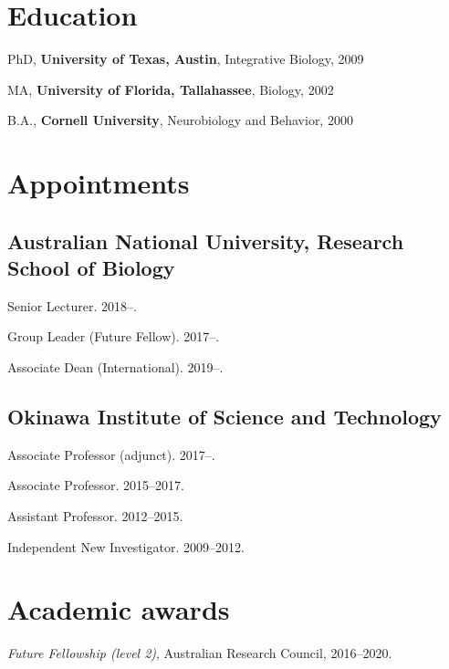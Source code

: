 \documentclass[11pt]{article}
\title{}
\def\printdate#1{\xprintdate#1-}
\def\xprintdate#1-#2-#3-{#1}
\def\daterange#1#2{\xprintdate#1---\xprintdate#2-}
\begin{document}
\maketitle

\section{Education}

\ind PhD, \textbf{University of Texas, Austin}, Integrative Biology, \printdate{2009-05-01}


\ind MA, \textbf{University of Florida, Tallahassee}, Biology, \printdate{2002-05-01}


\ind B.A., \textbf{Cornell University}, Neurobiology and Behavior, \printdate{2000-05-01}



\section{Appointments}

\subsection{Australian National University, Research School of Biology}
\ind Senior Lecturer. \printdate{2018-06-01}--.

\ind Group Leader (Future Fellow). \printdate{2017-07-30}--.

\ind Associate Dean (International). \printdate{2019-00-00}--.

\subsection{Okinawa Institute of Science and Technology}
\ind Associate Professor (adjunct). \printdate{2017-00-00}--.

\ind Associate Professor. \daterange{2015-00-00}{2017-00-00}.

\ind Assistant Professor. \daterange{2012-00-00}{2015-00-00}.

\ind Independent New Investigator. \daterange{2009-08-00}{2012-00-00}.


\section{Academic awards}

\ind \textit{Future Fellowship (level 2)}, Australian Research Council, 2016--2020.
\end{document}
